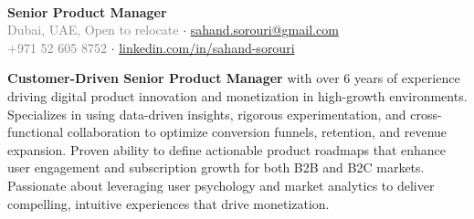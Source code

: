 \documentclass[a4paper,10pt]{article}
\newcommand{\graytext}[1]{\textcolor{grey}{#1}} %
\begin{document}
\thispagestyle{empty}
\begin{center}
\\
\vspace{7pt}
{\textbf{\LARGE{Senior Product Manager}}}\\
\normalsize
\graytext{Dubai, UAE, Open to relocate} $\cdot$ \href{mailto:sahand.sorouri@gmail.com}{sahand.sorouri@gmail.com}
\\
\graytext{+971 52 605 8752} $\cdot$ \href{https://linkedin.com/in/sahand-sorouri}{linkedin.com/in/sahand-sorouri \faExternalLink{}} %
\end{center}
\textbf{Customer-Driven Senior Product Manager} with over 6 years of experience driving digital product innovation and monetization in high-growth environments. Specializes in using data-driven insights, rigorous experimentation, and cross-functional collaboration to optimize conversion funnels, retention, and revenue expansion. Proven ability to define actionable product roadmaps that enhance user engagement and subscription growth for both B2B and B2C markets. Passionate about leveraging user psychology and market analytics to deliver compelling, intuitive experiences that drive monetization.
\end{document}
